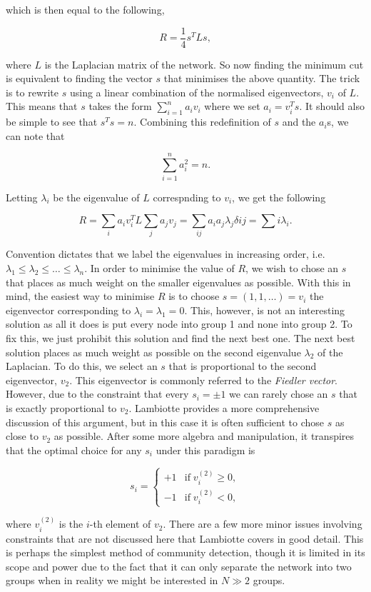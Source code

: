 which is then equal to the following,

$$ R = \frac{1}{4}s^TLs, $$

where $L$ is the Laplacian matrix of the network. So now finding the minimum cut is equivalent to finding the vector $s$ that minimises the above quantity. The trick is to rewrite $s$ using a linear combination of the normalised eigenvectors, $v_i$ of $L$. This means that $s$ takes the form $\sum_{i=1}^n a_iv_i$ where we set $a_i = v_i^T s$. It should also be simple to see that $s^Ts = n$. Combining this redefinition of $s$ and the $a_i$s, we can note that

$$ \sum_{i=1}^n a_i^2 = n. $$

Letting $\lambda_i$ be the eigenvalue of $L$ correspnding to $v_i$, we get the following

$$ R = \sum_i a_iv_i^TL\sum_ja_jv_j = \sum_{ij}a_ia_j\lambda_j\delta{ij} = \sum{i}\lambda_i. $$

Convention dictates that we label the eigenvalues in increasing order, i.e. $\lambda_1 \leq \lambda_2 \leq \dots \leq \lambda_n$. In order to minimise the value of $R$, we wish to chose an $s$ that places as much weight on the smaller eigenvalues as possible. With this in mind, the easiest way to minimise $R$ is to choose $s = (1, 1, \dots) = v_i$ the eigenvector corresponding to $\lambda_i = \lambda_1 = 0$. This, however, is not an interesting solution as all it does is put every node into group 1 and none into group 2. To fix this, we just prohibit this solution and find the next best one. The next best solution places as much weight as possible on the second eigenvalue $\lambda_2$ of the Laplacian. To do this, we select an $s$ that is proportional to the second eigenvector, $v_2$. This eigenvector is commonly referred to the \emph{Fiedler vector}. However, due to the constraint that every $s_i = \pm 1$ we can rarely chose an $s$ that is exactly proportional to $v_2$. Lambiotte provides a more comprehensive discussion of this argument, but in this case it is often sufficient to chose $s$ as close to $v_2$ as possible. After some more algebra and manipulation, it transpires that the optimal choice for any $s_i$ under this paradigm is 

$$ s_i = \begin{cases}
    +1 & \text{if} \; v_i^{(2)} \geq 0, \\
    -1 & \text{if} \; v_i^{(2)} < 0,
\end{cases} $$

where $v_i^{(2)}$ is the $i$-th element of $v_2$. There are a few more minor issues involving constraints that are not discussed here that Lambiotte covers in good detail\cite[27]{oxford:renaud_notes}. This is perhaps the simplest method of community detection, though it is limited in its scope and power due to the fact that it can only separate the network into two groups when in reality we might be interested in $N \gg 2$ groups.

